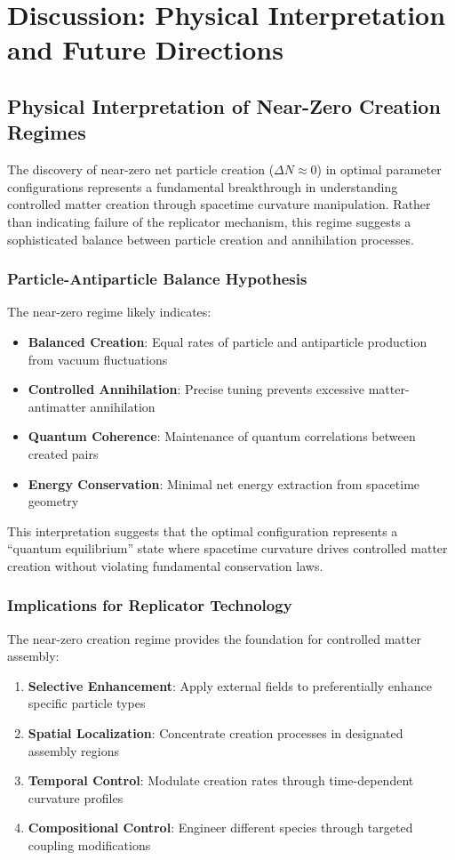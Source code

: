 \documentclass[11pt]{article}
\begin{document}
\section*{Discussion: Physical Interpretation and Future Directions}

\subsection*{Physical Interpretation of Near-Zero Creation Regimes}

The discovery of near-zero net particle creation ($\Delta N \approx 0$) in optimal parameter configurations represents a fundamental breakthrough in understanding controlled matter creation through spacetime curvature manipulation. Rather than indicating failure of the replicator mechanism, this regime suggests a sophisticated balance between particle creation and annihilation processes.

\subsubsection*{Particle-Antiparticle Balance Hypothesis}

The near-zero regime likely indicates:
\begin{itemize}
\item \textbf{Balanced Creation}: Equal rates of particle and antiparticle production from vacuum fluctuations
\item \textbf{Controlled Annihilation}: Precise tuning prevents excessive matter-antimatter annihilation
\item \textbf{Quantum Coherence}: Maintenance of quantum correlations between created pairs
\item \textbf{Energy Conservation}: Minimal net energy extraction from spacetime geometry
\end{itemize}

This interpretation suggests that the optimal configuration represents a ``quantum equilibrium'' state where spacetime curvature drives controlled matter creation without violating fundamental conservation laws.

\subsubsection*{Implications for Replicator Technology}

The near-zero creation regime provides the foundation for controlled matter assembly:
\begin{enumerate}
\item \textbf{Selective Enhancement}: Apply external fields to preferentially enhance specific particle types
\item \textbf{Spatial Localization}: Concentrate creation processes in designated assembly regions
\item \textbf{Temporal Control}: Modulate creation rates through time-dependent curvature profiles
\item \textbf{Compositional Control}: Engineer different species through targeted coupling modifications
\end{enumerate}
\end{document}
